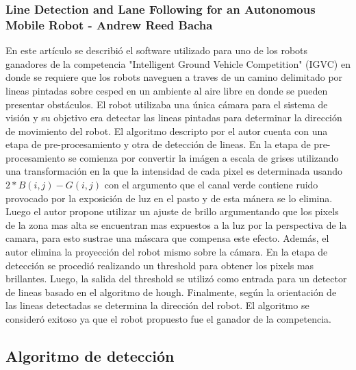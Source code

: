 	\subsubsection{Line Detection and Lane Following for an Autonomous Mobile Robot - Andrew Reed Bacha}
	En este artículo se describió el software utilizado para uno de los robots ganadores de la competencia "Intelligent Ground Vehicle Competition" (IGVC) en donde se requiere que los robots naveguen  a traves de un camino delimitado por lineas pintadas sobre cesped en un ambiente al aire libre en donde se pueden presentar obstáculos. El robot utilizaba una única cámara para el sistema de visión y su objetivo era detectar las lineas pintadas 
para determinar la dirección de movimiento del robot. El algoritmo descripto por el autor cuenta con una etapa de pre-procesamiento y otra de detección de lineas. En la etapa de pre-procesamiento se comienza por convertir la imágen a escala de grises utilizando una transformación en la que la intensidad de cada pixel es determinada usando $2*B(i,j) - G(i,j)$ con el argumento que el canal verde contiene ruido provocado por la exposición de luz en el pasto y de esta mánera se lo elimina. Luego el autor propone utilizar un ajuste de brillo argumentando que los pixels de la zona mas alta se encuentran mas expuestos a la luz por la perspectiva de la camara, para esto sustrae una máscara que compensa este efecto. Además, el autor elimina la proyección del robot mismo sobre la cámara. En la etapa de detección se procedió realizando un threshold para obtener los pixels mas brillantes. Luego, la salida del threshold se utilizó como entrada para un detector de lineas basado en el algoritmo de hough. Finalmente, según la orientación de las lineas detectadas se determina la dirección del robot. El algoritmo se consideró exitoso ya que el robot propuesto fue el ganador de la competencia.


	
\subsection{Algoritmo de detección}
